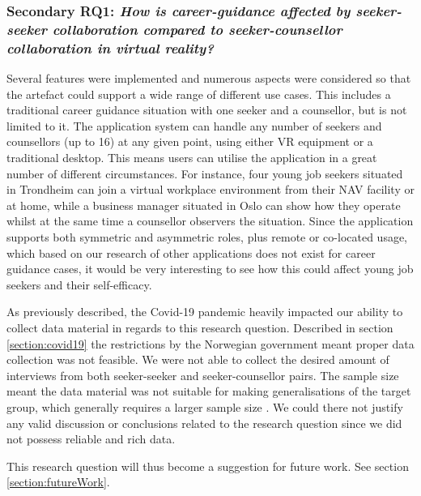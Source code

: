 


\subsubsection{Secondary RQ1: \textit{How is career-guidance affected by seeker-seeker collaboration compared to seeker-counsellor collaboration in virtual reality?}} 

Several features were implemented and numerous aspects were considered so that the artefact could support a wide range of different use cases. This includes a traditional career guidance situation with one seeker and a counsellor, but is not limited to it. The application system can handle any number of seekers and counsellors (up to 16) at any given point, using either VR equipment or a traditional desktop. This means users can utilise the application in a great number of different circumstances. For instance, four young job seekers situated in Trondheim can join a virtual workplace environment from their NAV facility or at home, while a business manager situated in Oslo can show how they operate whilst at the same time a counsellor observers the situation.           
Since the application supports both symmetric and asymmetric roles, plus remote or co-located usage, which based on our research of other applications does not exist for career guidance cases, it would be very interesting to see how this could affect young job seekers and their self-efficacy. 


As previously described, the Covid-19 pandemic heavily impacted our ability to collect data material in regards to this research question. Described in section \ref{section:covid19} the restrictions by the Norwegian government meant proper data collection was not feasible. We were not able to collect the desired amount of interviews from both seeker-seeker and seeker-counsellor pairs. The sample size meant the data material was not suitable for making generalisations of the target group, which generally requires a larger sample size \cite{oates2005researching}. We could there not justify any valid discussion or conclusions related to the research question since we did not possess reliable and rich data.                

This research question will thus become a suggestion for future work. See section \ref{section:futureWork}.  




